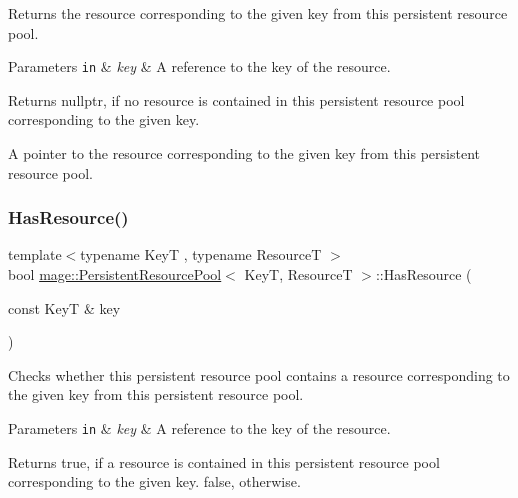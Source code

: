 Returns the resource corresponding to the given key from this persistent resource pool.


\begin{DoxyParams}[1]{Parameters}
\mbox{\tt in}  & {\em key} & A reference to the key of the resource. \\
\hline
\end{DoxyParams}
\begin{DoxyReturn}{Returns}
{\ttfamily nullptr}, if no resource is contained in this persistent resource pool corresponding to the given key. 

A pointer to the resource corresponding to the given key from this persistent resource pool. 
\end{DoxyReturn}
\hypertarget{classmage_1_1_persistent_resource_pool_ad33abfe0eda43b4295ed6b9e7532f3c5}{}\label{classmage_1_1_persistent_resource_pool_ad33abfe0eda43b4295ed6b9e7532f3c5} 
\subsubsection{\texorpdfstring{Has\+Resource()}{HasResource()}}
{\footnotesize\ttfamily template$<$typename KeyT , typename ResourceT $>$ \\
bool \hyperlink{classmage_1_1_persistent_resource_pool}{mage\+::\+Persistent\+Resource\+Pool}$<$ KeyT, ResourceT $>$\+::Has\+Resource (\begin{DoxyParamCaption}\item[{const KeyT \&}]{key }\end{DoxyParamCaption})\hspace{0.3cm}{\ttfamily [noexcept]}}

Checks whether this persistent resource pool contains a resource corresponding to the given key from this persistent resource pool.


\begin{DoxyParams}[1]{Parameters}
\mbox{\tt in}  & {\em key} & A reference to the key of the resource. \\
\hline
\end{DoxyParams}
\begin{DoxyReturn}{Returns}
{\ttfamily true}, if a resource is contained in this persistent resource pool corresponding to the given key. {\ttfamily false}, otherwise. 
\end{DoxyReturn}
\hypertarget{classmage_1_1_persistent_resource_pool_abae08ecfdeb096690bdbabc2a0b1f46b}{}\label{classmage_1_1_persistent_resource_pool_abae08ecfdeb096690bdbabc2a0b1f46b} 
